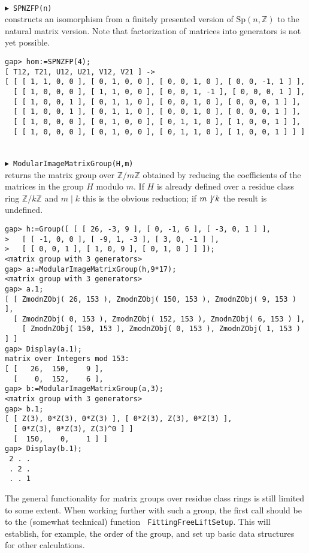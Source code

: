 \documentclass[a4paper,12pt]{amsart}
\newcommand{\Z}{\mathbb{Z}}
\newcommand{\Sp}{\mathrm{Sp}}
\def\mycmd#1{\ \smallskip\\$\blacktriangleright$\ #1\\}
\begin{document}
\mycmd{{\tt SPNZFP(n)}}
constructs an isomorphism from a finitely presented version of $\Sp(n,\Z)$
to the natural matrix version. Note that factorization of matrices into
generators is not yet possible.
\begin{verbatim}
gap> hom:=SPNZFP(4);
[ T12, T21, U12, U21, V12, V21 ] ->
[ [ [ 1, 1, 0, 0 ], [ 0, 1, 0, 0 ], [ 0, 0, 1, 0 ], [ 0, 0, -1, 1 ] ],
  [ [ 1, 0, 0, 0 ], [ 1, 1, 0, 0 ], [ 0, 0, 1, -1 ], [ 0, 0, 0, 1 ] ],
  [ [ 1, 0, 0, 1 ], [ 0, 1, 1, 0 ], [ 0, 0, 1, 0 ], [ 0, 0, 0, 1 ] ],
  [ [ 1, 0, 0, 1 ], [ 0, 1, 1, 0 ], [ 0, 0, 1, 0 ], [ 0, 0, 0, 1 ] ],
  [ [ 1, 0, 0, 0 ], [ 0, 1, 0, 0 ], [ 0, 1, 1, 0 ], [ 1, 0, 0, 1 ] ],
  [ [ 1, 0, 0, 0 ], [ 0, 1, 0, 0 ], [ 0, 1, 1, 0 ], [ 1, 0, 0, 1 ] ] ]
\end{verbatim}
%

\mycmd{{\tt ModularImageMatrixGroup(H,m)}}
returns the matrix group over $\Z/m\Z$ obtained by reducing the coefficients
of the matrices in the group $H$ modulo $m$. 
If $H$ is already defined over a residue
class ring $\Z/k\Z$ and $m\mid k$ this is the obvious reduction; if
$m\not\,\mid k$ the result is undefined.
\begin{verbatim}
gap> h:=Group([ [ [ 26, -3, 9 ], [ 0, -1, 6 ], [ -3, 0, 1 ] ],
>   [ [ -1, 0, 0 ], [ -9, 1, -3 ], [ 3, 0, -1 ] ],
>   [ [ 0, 0, 1 ], [ 1, 0, 9 ], [ 0, 1, 0 ] ] ]);
<matrix group with 3 generators>
gap> a:=ModularImageMatrixGroup(h,9*17);
<matrix group with 3 generators>
gap> a.1;
[ [ ZmodnZObj( 26, 153 ), ZmodnZObj( 150, 153 ), ZmodnZObj( 9, 153 ) ],
  [ ZmodnZObj( 0, 153 ), ZmodnZObj( 152, 153 ), ZmodnZObj( 6, 153 ) ],
    [ ZmodnZObj( 150, 153 ), ZmodnZObj( 0, 153 ), ZmodnZObj( 1, 153 ) ] ]
gap> Display(a.1);
matrix over Integers mod 153:
[ [   26,  150,    9 ],
  [    0,  152,    6 ],
gap> b:=ModularImageMatrixGroup(a,3);
<matrix group with 3 generators>
gap> b.1;
[ [ Z(3), 0*Z(3), 0*Z(3) ], [ 0*Z(3), Z(3), 0*Z(3) ],
  [ 0*Z(3), 0*Z(3), Z(3)^0 ] ]
  [  150,    0,    1 ] ]
gap> Display(b.1);
 2 . .
 . 2 .
 . . 1
\end{verbatim}

The general functionality for matrix groups over residue class rings is
still limited to some extent. When working further with such a group, the first
call should be to the (somewhat technical) function {\tt
FittingFreeLiftSetup}. This will establish, for example, the order of the
group, and set up basic data structures for other calculations.
\end{document}
